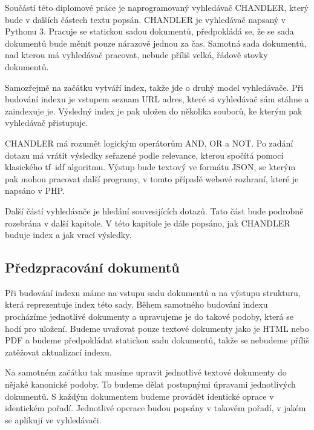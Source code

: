 \documentclass[12pt]{article}
\newcommand{\name}{CHANDLER}
\begin{document}
Součástí této diplomové práce je naprogramovaný vyhledávač \name, který bude v dalších částech textu popsán. \name{} je vyhledávač napsaný v Pythonu 3. Pracuje se statickou sadou dokumentů, předpokládá se, že se sada dokumentů bude měnit pouze nárazově jednou za čas. Samotná sada dokumentů, nad kterou má vyhledávač pracovat, nebude příliš velká, řádově stovky dokumentů. 

Samozřejmě na začátku vytváří index, takže jde o druhý model vyhledávače. Při budování indexu je vstupem seznam URL adres, které si vyhledávač sám stáhne a zaindexuje je. Výsledný index je pak uložen do několika souborů, ke kterým pak vyhledávač přistupuje. 

\name{} má rozumět logickým operátorům AND, OR a NOT. Po zadání dotazu má vrátit výsledky seřazené podle relevance, kterou spočítá pomocí klasického tf–idf algoritmu. Výstup bude textový ve formátu JSON, se kterým pak mohou pracovat další programy, v tomto případě webové rozhraní, které je napsáno v PHP. 

Další částí vyhledávače je hledání souvesijících dotazů. Tato část bude podrobně rozebrána v další kapitole. V této kapitole je dále popsáno, jak \name{} buduje index a jak vrací výsledky. 



\subsection{Předzpracování dokumentů}
\label{prepr}
Při budování indexu máme na vstupu sadu dokumentů a na výstupu strukturu, která reprezentuje index této sady. Během samotného budování indexu procházíme jednotlivé dokumenty a upravujeme je do takové podoby, která se hodí pro uložení. Budeme uvažovat pouze textové dokumenty jako je HTML nebo PDF a budeme předpokládat statickou sadu dokumentů, takže se nebudeme příliš zatěžovat aktualizací indexu. 

Na samotném začátku tak musíme upravit jednotlivé textové dokumenty do nějaké kanonické podoby. To budeme dělat postupnými úpravami jednotlivých dokumentů. S každým dokumentem budeme provádět identické oprace v identickém pořadí. Jednotlivé operace budou popsány v takovém pořadí, v jakém se aplikují ve vyhledávači. 
\end{document}
